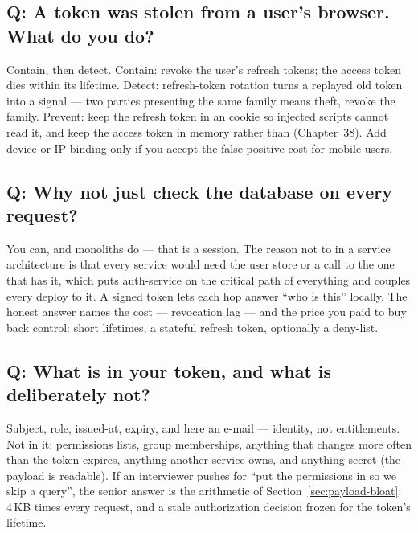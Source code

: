 \subsection*{Q: A token was stolen from a user's browser. What do you do?}

Contain, then detect. Contain: revoke the user's refresh tokens; the
access token dies within its lifetime. Detect: refresh-token rotation
turns a replayed old token into a signal --- two parties presenting the
same family means theft, revoke the family. Prevent: keep the refresh
token in an  cookie so injected scripts cannot read it,
and keep the access token in memory rather than 
(Chapter~38). Add device or IP binding only if you accept the
false-positive cost for mobile users.

\subsection*{Q: Why not just check the database on every request?}

You can, and monoliths do --- that is a session. The reason not to in
a service architecture is that every service would need the user store
or a call to the one that has it, which puts auth-service on the
critical path of everything and couples every deploy to it. A signed
token lets each hop answer ``who is this'' locally. The honest answer
names the cost --- revocation lag --- and the price you paid to buy
back control: short lifetimes, a stateful refresh token, optionally a
deny-list.

\subsection*{Q: What is in your token, and what is deliberately not?}

Subject, role, issued-at, expiry, and here an e-mail --- identity, not
entitlements. Not in it: permissions lists, group memberships, anything
that changes more often than the token expires, anything another
service owns, and anything secret (the payload is readable). If an
interviewer pushes for ``put the permissions in so we skip a query'',
the senior answer is the arithmetic of Section~\ref{sec:payload-bloat}:
4\,KB times every request, and a stale authorization decision
frozen for the token's lifetime.

